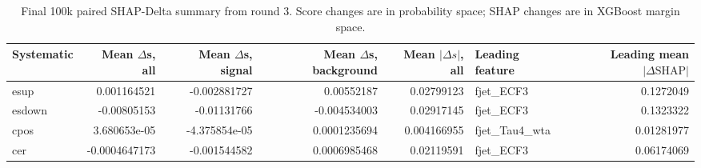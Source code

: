 \begin{table}[tbp]
\centering
\caption{Final 100k paired SHAP-Delta summary from round 3. Score changes are in probability space; SHAP changes are in XGBoost margin space.}
\label{tab:shap-delta-100k}
\begin{tabular}{lrrrrlr}
\toprule
Systematic & Mean $\Delta$s, all & Mean $\Delta$s, signal & Mean $\Delta$s, background & Mean $|\Delta s|$, all & Leading feature & Leading mean $|\Delta\mathrm{SHAP}|$ \\
\midrule
esup & 0.001164521 & -0.002881727 & 0.00552187 & 0.02799123 & fjet\_ECF3 & 0.1272049 \\
esdown & -0.00805153 & -0.01131766 & -0.004534003 & 0.02917145 & fjet\_ECF3 & 0.1323322 \\
cpos & 3.680653e-05 & -4.375854e-05 & 0.0001235694 & 0.004166955 & fjet\_Tau4\_wta & 0.01281977 \\
cer & -0.0004647173 & -0.001544582 & 0.0006985468 & 0.02119591 & fjet\_ECF3 & 0.06174069 \\
\bottomrule
\end{tabular}
\end{table}
